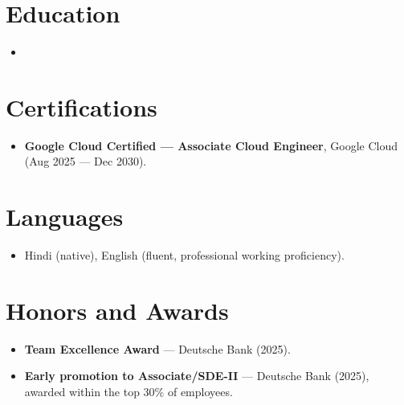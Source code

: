 \documentclass[11pt,a4paper,sans]{moderncv}
\begin{document}

\section{Education}
\vspace{1pt}
\begin{itemize}

\item{}

\end{itemize}


\section{Certifications}
\vspace{1pt}
\begin{itemize}
\item{\textbf{Google Cloud Certified --- Associate Cloud Engineer}, Google Cloud (Aug 2025 --- Dec 2030).}
\end{itemize}


\section{Languages}
\vspace{1pt}
\begin{itemize}
\item Hindi (native), English (fluent, professional working proficiency).
\end{itemize}


\section{Honors and Awards}
\vspace{1pt}
\begin{itemize}
\item{\textbf{Team Excellence Award} --- Deutsche Bank (2025).}
\item{\textbf{Early promotion to Associate/SDE-II} --- Deutsche Bank (2025), awarded within the top 30\% of employees.}
\end{itemize}
\end{document}
